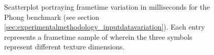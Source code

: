 
\begin{figure}
	\centering
	

    \caption[Phong benchmark frametime volatility]{Scatterplot portraying frametime variation in milliseconds for the Phong benchmark (see section \ref{sec:experimentalmethodology_inputdatavariation}). Each entry represents a frametime sample of wherein the three symbols represent different texture dimensions.}
    \label{fig:scattersphong}
\end{figure}